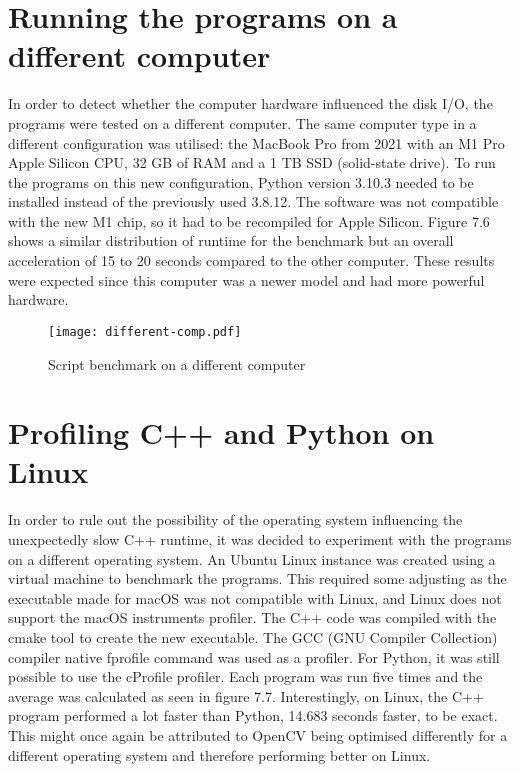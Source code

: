 \section{Running the programs on a different computer}
In order to detect whether the computer hardware influenced the disk I/O, the programs were tested on a different computer. The same computer type in a different configuration was utilised: the MacBook Pro from 2021 with an M1 Pro Apple Silicon CPU, 32 GB of RAM and a 1 TB SSD (solid-state drive). To run the programs on this new configuration, Python version 3.10.3 needed to be installed instead of the previously used 3.8.12. The software was not compatible with the new M1 chip, so it had to be recompiled for Apple Silicon.
Figure 7.6 shows a similar distribution of runtime for the benchmark but an overall acceleration of 15 to 20 seconds compared to the other computer. These results were expected since this computer was a newer model and had more powerful hardware.

\begin{figure}[H]
	\centering
	\texttt{[image: different-comp.pdf]}
	\caption{Script benchmark on a different computer}
	\label{figure:different-comp}
\end{figure}

\section{Profiling C++ and Python on Linux}
In order to rule out the possibility of the operating system influencing the unexpectedly slow C++ runtime, it was decided to experiment with the programs on a different operating system. An Ubuntu Linux instance was created using a virtual machine to benchmark the programs. This required some adjusting as the executable made for macOS was not compatible with Linux, and Linux does not support the macOS instruments profiler. The C++ code was compiled with the cmake tool \cite{cmake} to create the new executable. The GCC (GNU Compiler Collection) \cite{gcc} compiler native fprofile command was used as a profiler. For Python, it was still possible to use the cProfile profiler. Each program was run five times and the average was calculated as seen in figure 7.7.
Interestingly, on Linux, the C++ program performed a lot faster than Python, 14.683 seconds faster, to be exact. This might once again be attributed to OpenCV being optimised differently for a different operating system and therefore performing better on Linux.


